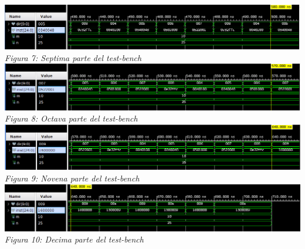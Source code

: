 \documentclass[8pt,executivepaper]{article}
\begin{document}
\begin{center}
  \includegraphics[scale=0.45]{imgs/siete.png}\\
  \textit{Figura 7: Septima parte del test-bench}\\
  \includegraphics[scale=0.45]{imgs/ocho.png}\\
  \textit{Figura 8: Octava parte del test-bench}\\
  \includegraphics[scale=0.45]{imgs/nueve.png}\\
  \textit{Figura 9: Novena parte del test-bench}\\
  \includegraphics[scale=0.45]{imgs/diez.png}\\
  \textit{Figura 10: Decima parte del test-bench}

\end{center}
\end{document}
